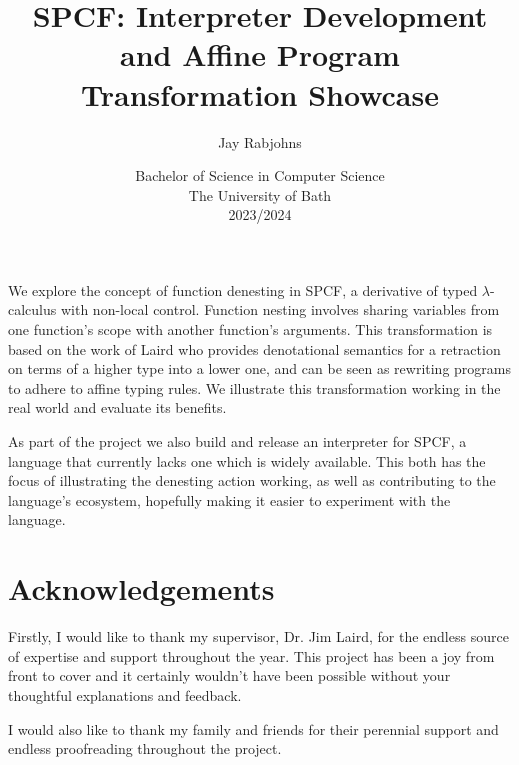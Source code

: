 \documentclass[12pt,a4paper]{report}
\title{SPCF: Interpreter Development and Affine Program Transformation Showcase}
\author{Jay Rabjohns}
\date{Bachelor of Science in Computer Science\\ 
      The University of Bath\\
      2023/2024}
\theoremstyle{definition}
\theoremstyle{definition}
\theoremstyle{remark}
\begin{document}
\hypersetup{pageanchor=false}

\lstset{language=Haskell,breaklines,breakatwhitespace,basicstyle=\small}

\setcounter{page}{0}

\maketitle
\newpage

\newpage

\hypersetup{pageanchor=true}
\abstract

We explore the concept of function denesting in SPCF, a derivative of typed $\lambda$-calculus with non-local control. Function nesting involves sharing variables from one function’s scope with another function's arguments. This transformation is based on the work of Laird who provides denotational semantics for a retraction on terms of a higher type into a lower one, and can be seen as rewriting programs to adhere to affine typing rules. We illustrate this transformation working in the real world and evaluate its benefits. 

As part of the project we also build and release an interpreter for SPCF, a language that currently lacks one which is widely available. This both has the focus of illustrating the denesting action working, as well as contributing to the language’s ecosystem, hopefully making it easier to experiment with the language.
\newpage

\tableofcontents
\newpage

\listoffigures
\newpage

\listoftables
\newpage

\chapter*{Acknowledgements}
Firstly, I would like to thank my supervisor, Dr. Jim Laird, for the endless source of expertise and support throughout the year. This project has been a joy from front to cover and it certainly wouldn't have been possible without your thoughtful explanations and feedback.

I would also like to thank my family and friends for their perennial support and endless proofreading throughout the project.
\end{document}
